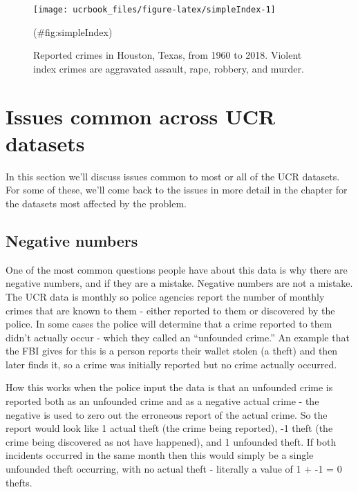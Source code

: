 \documentclass[
  12pt,
  openany]{book}
\begin{document}
\begin{figure}

{\centering \texttt{[image: ucrbook\_files/figure-latex/simpleIndex-1]} 

}

\caption{Reported crimes in Houston, Texas, from 1960 to 2018. Violent index crimes are aggravated assault, rape, robbery, and murder.}(\#fig:simpleIndex)
\end{figure}

\hypertarget{issues-common-across-ucr-datasets}{%
\section{Issues common across UCR datasets}\label{issues-common-across-ucr-datasets}}

In this section we'll discuss issues common to most or all of the UCR datasets. For some of these, we'll come back to the issues in more detail in the chapter for the datasets most affected by the problem.

\hypertarget{negative-numbers}{%
\subsection{Negative numbers}\label{negative-numbers}}

One of the most common questions people have about this data is why there are negative numbers, and if they are a mistake. Negative numbers are not a mistake. The UCR data is monthly so police agencies report the number of monthly crimes that are known to them - either reported to them or discovered by the police. In some cases the police will determine that a crime reported to them didn't actually occur - which they called an ``unfounded crime.'' An example that the FBI gives for this is a person reports their wallet stolen (a theft) and then later finds it, so a crime was initially reported but no crime actually occurred.

How this works when the police input the data is that an unfounded crime is reported both as an unfounded crime and as a negative actual crime - the negative is used to zero out the erroneous report of the actual crime. So the report would look like 1 actual theft (the crime being reported), -1 theft (the crime being discovered as not have happened), and 1 unfounded theft. If both incidents occurred in the same month then this would simply be a single unfounded theft occurring, with no actual theft - literally a value of 1 + -1 = 0 thefts.
\end{document}
